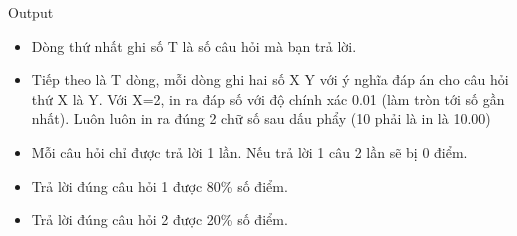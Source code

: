Output
\begin{itemize}
	\item Dòng thứ nhất ghi số T là số câu hỏi mà bạn trả lời.
	\item Tiếp theo là T dòng, mỗi dòng ghi hai số X Y với ý nghĩa đáp án cho câu hỏi thứ X là Y. Với X=2, in ra đáp số với độ chính xác 0.01 (làm tròn tới số gần nhất). Luôn luôn in ra đúng 2 chữ số sau dấu phẩy (10 phải là in là 10.00)
	\item Mỗi câu hỏi chỉ được trả lời 1 lần. Nếu trả lời 1 câu 2 lần sẽ bị 0 điểm.
	\item Trả lời đúng câu hỏi 1 được 80\% số điểm.
	\item Trả lời đúng câu hỏi 2 được 20\% số điểm.
\end{itemize}